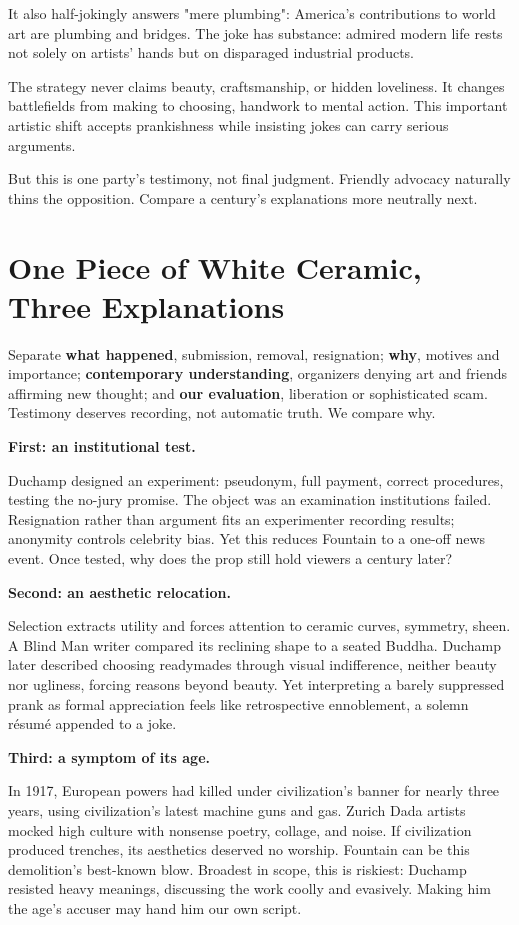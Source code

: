 It also half-jokingly answers "mere plumbing": America's contributions to world art are plumbing and bridges. The joke has substance: admired modern life rests not solely on artists' hands but on disparaged industrial products.

The strategy never claims beauty, craftsmanship, or hidden loveliness. It changes battlefields from making to choosing, handwork to mental action. This important artistic shift accepts prankishness while insisting jokes can carry serious arguments.

But this is one party's testimony, not final judgment. Friendly advocacy naturally thins the opposition. Compare a century's explanations more neutrally next.

\section[White Ceramic, Three Explanations]{One Piece of White Ceramic, Three Explanations}
Separate \textbf{what happened}, submission, removal, resignation; \textbf{why}, motives and importance; \textbf{contemporary understanding}, organizers denying art and friends affirming new thought; and \textbf{our evaluation}, liberation or sophisticated scam. Testimony deserves recording, not automatic truth. We compare why.

\textbf{First: an institutional test.}

Duchamp designed an experiment: pseudonym, full payment, correct procedures, testing the no-jury promise. The object was an examination institutions failed. Resignation rather than argument fits an experimenter recording results; anonymity controls celebrity bias. Yet this reduces Fountain to a one-off news event. Once tested, why does the prop still hold viewers a century later?

\textbf{Second: an aesthetic relocation.}

Selection extracts utility and forces attention to ceramic curves, symmetry, sheen. A Blind Man writer compared its reclining shape to a seated Buddha. Duchamp later described choosing readymades through visual indifference, neither beauty nor ugliness, forcing reasons beyond beauty. Yet interpreting a barely suppressed prank as formal appreciation feels like retrospective ennoblement, a solemn résumé appended to a joke.

\textbf{Third: a symptom of its age.}

In 1917, European powers had killed under civilization's banner for nearly three years, using civilization's latest machine guns and gas. Zurich Dada artists mocked high culture with nonsense poetry, collage, and noise. If civilization produced trenches, its aesthetics deserved no worship. Fountain can be this demolition's best-known blow. Broadest in scope, this is riskiest: Duchamp resisted heavy meanings, discussing the work coolly and evasively. Making him the age's accuser may hand him our own script.

